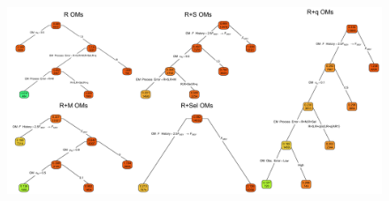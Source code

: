 \documentclass[
  12pt,
]{article}
\providecommand{\DIFaddbeginFL}{} %
\providecommand{\DIFaddendFL}{} %
\providecommand{\DIFdelbeginFL}{} %
\providecommand{\DIFdelendFL}{} %
\newcommand{\DIFscaledelfig}{0.5}
\newlength{\DIFdelgraphicswidth} %
\newlength{\DIFdelgraphicsheight} %
\newcommand{\DIFaddincludegraphics}[2][]{{\color{blue}\fbox{\DIFOincludegraphics[#1]{#2}}}} %
\newcommand{\DIFdelincludegraphics}[2][]{%
\sbox{\DIFdelgraphicsbox}{\DIFOincludegraphics[#1]{#2}}%
\settoboxwidth{\DIFdelgraphicswidth}{\DIFdelgraphicsbox} %
\settoboxtotalheight{\DIFdelgraphicsheight}{\DIFdelgraphicsbox} %
\scalebox{\DIFscaledelfig}{%
\parbox[b]{\DIFdelgraphicswidth}{\usebox{\DIFdelgraphicsbox}\\[-\baselineskip] \rule{\DIFdelgraphicswidth}{0em}}\llap{\resizebox{\DIFdelgraphicswidth}{\DIFdelgraphicsheight}{%
\setlength{\unitlength}{\DIFdelgraphicswidth}%
\begin{picture}(1,1)%
\thicklines\linethickness{2pt} %
{\color[rgb]{1,0,0}\put(0,0){\framebox(1,1){}}}%
{\color[rgb]{1,0,0}\put(0,0){\line( 1,1){1}}}%
{\color[rgb]{1,0,0}\put(0,1){\line(1,-1){1}}}%
\end{picture}%
}\hspace*{3pt}}} %
} %
\DeclareRobustCommand{\DIFaddbeginFL}{\DIFOaddbeginFL \let\includegraphics\DIFaddincludegraphics} %
\DeclareRobustCommand{\DIFaddendFL}{\DIFOaddendFL \let\includegraphics\DIFOincludegraphics} %
\DeclareRobustCommand{\DIFdelbeginFL}{\DIFOdelbeginFL \let\includegraphics\DIFdelincludegraphics} %
\DeclareRobustCommand{\DIFdelendFL}{\DIFOaddendFL \let\includegraphics\DIFOincludegraphics} %
\begin{document}
\begin{landscape}
\begin{figure}
\begin{center}
\DIFdelbeginFL %
\DIFdelendFL \DIFaddbeginFL \includegraphics[width = 1.4\textwidth]{SR_b_bias_regtree_plots}
\DIFaddendFL \end{center}

\end{figure}
\end{landscape}
\end{document}

